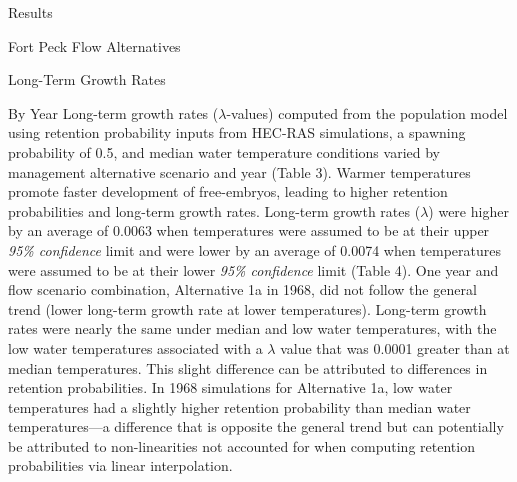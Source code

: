 \documentclass[12pt]{article}
\begin{document}
\begin{section}{Results}
\begin{subsection}{Fort Peck Flow Alternatives}
\begin{subsubsection}{Long-Term Growth Rates}
\begin{paragraph}{By Year}
Long-term growth rates ($\lambda$-values) computed from the population model using retention probability inputs from HEC-RAS simulations, a spawning probability of 0.5, and median water temperature conditions varied by management alternative scenario and year (Table 3).  Warmer temperatures promote faster development of free-embryos, leading to higher retention probabilities and long-term growth rates.  Long-term growth rates ($\lambda$) were higher by an average of 0.0063 when temperatures were assumed to be at their upper \textit{95\% confidence} limit and were lower by an average of 0.0074 when temperatures were assumed to be at their lower \textit{95\% confidence} limit (Table 4).  %
One year and flow scenario combination, Alternative 1a in 1968, did not follow the general trend (lower long-term growth rate at lower temperatures).  Long-term growth rates were nearly the same under median and low water temperatures, with the low water temperatures associated with a $\lambda$ value that was 0.0001 greater than at median temperatures.  This slight difference can be attributed to differences in retention probabilities.  In 1968 simulations for Alternative 1a, low water temperatures had a slightly higher retention probability than median water temperatures---a difference that is opposite the general trend but can potentially be attributed to non-linearities not accounted for when computing retention probabilities via linear interpolation.\\    


\end{paragraph}
\end{subsubsection}
\end{subsection}
\end{section}
\end{document}

